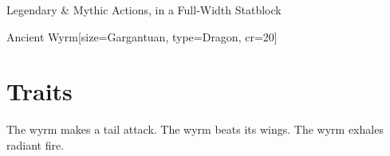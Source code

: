\begin{ExampleBlock}{Legendary \& Mythic Actions, in a Full-Width Statblock}
\begin{RpgStat*}{Ancient Wyrm}[size=Gargantuan, type=Dragon, cr=20]
    \section{Traits}
    \RpgStatLegendarySection[uses=3, defiance]
         The wyrm makes a tail attack.
         The wyrm beats its wings.
    \RpgStatMythicSection[narration={The wyrm's scales blaze with light, and it rises again!}]
         The wyrm exhales radiant fire.
\end{RpgStat*}


\end{ExampleBlock}
